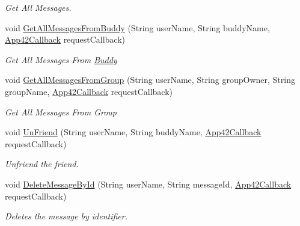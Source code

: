 \begin{DoxyCompactItemize}
\begin{DoxyCompactList}\small\item\em Get All Messages. \end{DoxyCompactList}\item 
void \hyperlink{classcom_1_1shephertz_1_1app42_1_1paas_1_1sdk_1_1windows_1_1buddy_1_1_buddy_service_abe831a8c281945e3bf57bb7ae81e69a9}{Get\+All\+Messages\+From\+Buddy} (String user\+Name, String buddy\+Name, \hyperlink{interfacecom_1_1shephertz_1_1app42_1_1paas_1_1sdk_1_1windows_1_1_app42_callback}{App42\+Callback} request\+Callback)
\begin{DoxyCompactList}\small\item\em Get All Messages From \hyperlink{classcom_1_1shephertz_1_1app42_1_1paas_1_1sdk_1_1windows_1_1buddy_1_1_buddy}{Buddy} \end{DoxyCompactList}\item 
void \hyperlink{classcom_1_1shephertz_1_1app42_1_1paas_1_1sdk_1_1windows_1_1buddy_1_1_buddy_service_a396fbe43c82b8f2c04e898e67e1b28b9}{Get\+All\+Messages\+From\+Group} (String user\+Name, String group\+Owner, String group\+Name, \hyperlink{interfacecom_1_1shephertz_1_1app42_1_1paas_1_1sdk_1_1windows_1_1_app42_callback}{App42\+Callback} request\+Callback)
\begin{DoxyCompactList}\small\item\em Get All Messages From Group \end{DoxyCompactList}\item 
void \hyperlink{classcom_1_1shephertz_1_1app42_1_1paas_1_1sdk_1_1windows_1_1buddy_1_1_buddy_service_a1898f44ce84bc18b3dcb80ba03d8543c}{Un\+Friend} (String user\+Name, String buddy\+Name, \hyperlink{interfacecom_1_1shephertz_1_1app42_1_1paas_1_1sdk_1_1windows_1_1_app42_callback}{App42\+Callback} request\+Callback)
\begin{DoxyCompactList}\small\item\em Unfriend the friend. \end{DoxyCompactList}\item 
void \hyperlink{classcom_1_1shephertz_1_1app42_1_1paas_1_1sdk_1_1windows_1_1buddy_1_1_buddy_service_a9b5f161db681dcddde79ec8063d60cc8}{Delete\+Message\+By\+Id} (String user\+Name, String message\+Id, \hyperlink{interfacecom_1_1shephertz_1_1app42_1_1paas_1_1sdk_1_1windows_1_1_app42_callback}{App42\+Callback} request\+Callback)
\begin{DoxyCompactList}\small\item\em Deletes the message by identifier. \end{DoxyCompactList}\item 

\end{DoxyCompactItemize}
